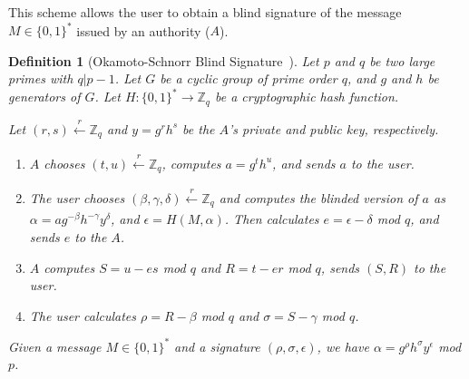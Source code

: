 \documentclass[conference]{IEEEtran}
\newtheorem{definition}{Definition}
\begin{document}
This scheme allows the user to obtain a blind signature of the message $M\in \{0,1\}^*$ issued by an authority ($A$). 

\begin{definition}[Okamoto-Schnorr Blind Signature~\cite{okamoto1992provably}]
Let $p$ and $q$ be two large primes with $q|p-1$. Let $G$ be a cyclic group of prime order $q$, and $g$ and $h$ be generators of $G$. Let $H:\{0,1\}^*\rightarrow \mathbb{Z}_q$ be a cryptographic hash function.
\begin{LaTeXdescription}
\item[Key Generation:] Let $(r,s) \xleftarrow[]{r}\mathbb{Z}_q$ and $y=g^rh^s$ be the $A$'s private and public key, respectively.
\item[Blind signature protocol:]
\begin{enumerate}
    \item $A$ chooses $(t,u) \xleftarrow[]{r}\mathbb{Z}_q$, computes $a = g^th^u$, and sends $a$ to the user.
    \item The user chooses $(\beta, \gamma, \delta) \xleftarrow[]{r}\mathbb{Z}_q$ and computes the blinded version of $a$ as $\alpha=ag^{-\beta} h^{-\gamma} y^\delta$, and $\epsilon=H(M,\alpha)$. Then calculates $e=\epsilon-\delta$ mod $q$, and sends $e$ to the $A$.
    \item $A$ computes $S=u-es$ mod $q$ and $R=t-er$ mod $q$, sends $(S,R)$ to the user.
    \item The user calculates $\rho=R-\beta$ mod $q$ and $\sigma=S-\gamma$ mod $q$.
\end{enumerate}
\item[Verification:] Given a message $M\in \{0,1\}^*$ and a signature $(\rho,\sigma,\epsilon)$, we have $\alpha=g^\rho h^\sigma y^\epsilon$ mod $p$.
\end{LaTeXdescription}
\end{definition}
\end{document}
